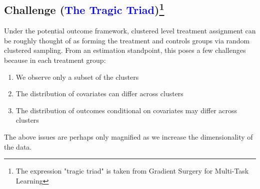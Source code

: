 \documentclass[a4paper,12pt]{article}
\begin{document}
\subsection{Challenge (\textcolor{blue}{The Tragic Triad})\footnote{The expression "tragic triad" is taken from Gradient Surgery for Multi-Task Learning}}
Under the potential outcome framework, clustered level treatment assignment can be roughly thought of as forming the treatment and controls groups via random clustered sampling. From an estimation standpoint, this poses a few challenges because in each treatment group:
\begin{enumerate}
    \item We observe only a subset of the clusters
    \item The distribution of covariates can differ across clusters
    \item The distribution of outcomes conditional on covariates may differ across clusters
\end{enumerate}
The above issues are perhaps only magnified as we increase the dimensionality of the data. 
\end{document}
